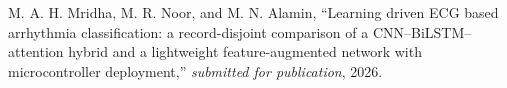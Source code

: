 %


\begin{enumerate}[label={[\arabic*]}, leftmargin=2.2em]
  \item M. A. H. Mridha, M. R. Noor, and M. N. Alamin, ``Learning driven
        ECG based arrhythmia classification: a record-disjoint comparison
        of a CNN--BiLSTM--attention hybrid and a lightweight
        feature-augmented network with microcontroller deployment,''
        \textit{submitted for publication}, 2026.
\end{enumerate}

\clearpage